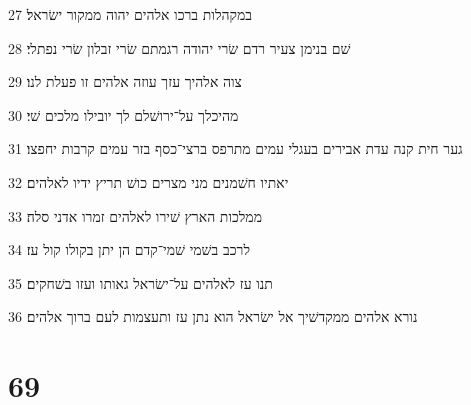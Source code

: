 \par 27 במקהלות ברכו אלהים יהוה ממקור ישׂראל׃
\par 28 שׁם בנימן צעיר רדם שׂרי יהודה רגמתם שׂרי זבלון שׂרי נפתלי׃
\par 29 צוה אלהיך עזך עוזה אלהים זו פעלת לנו׃
\par 30 מהיכלך על־ירושׁלם לך יובילו מלכים שׁי׃
\par 31 גער חית קנה עדת אבירים בעגלי עמים מתרפס ברצי־כסף בזר עמים קרבות יחפצו׃
\par 32 יאתיו חשׁמנים מני מצרים כושׁ תריץ ידיו לאלהים׃
\par 33 ממלכות הארץ שׁירו לאלהים זמרו אדני סלה׃
\par 34 לרכב בשׁמי שׁמי־קדם הן יתן בקולו קול עז׃
\par 35 תנו עז לאלהים על־ישׂראל גאותו ועזו בשׁחקים׃
\par 36 נורא אלהים ממקדשׁיך אל ישׂראל הוא נתן עז ותעצמות לעם ברוך אלהים׃

\chapter{69}


